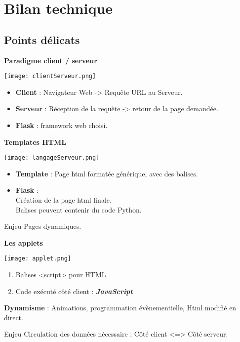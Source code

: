 	\section{Bilan technique}
		\subsection*{Points délicats}
		\begin{frame}
			\textbf{Paradigme client / serveur}\\
				\begin{center}\texttt{[image: clientServeur.png]}\end{center}
				\begin{itemize}
				\item \textbf{Client} : Navigateur Web -> Requête URL au Serveur.
				\item \textbf{Serveur} : Réception de la requête -> retour de la page demandée.
				\item \textbf{Flask} : framework web choisi.
				\end{itemize}
		\end{frame}
		
		\begin{frame}
			\textbf{Templates HTML}\\
				\begin{center}\texttt{[image: langageServeur.png]}\end{center}
				\begin{itemize}
				\item \textbf{Template} : Page html formatée générique, avec des balises.
				\item \textbf{Flask} :\\
					Création de la page html finale.\\
					Balises peuvent contenir du code Python.
				\end{itemize}
				\begin{block}{Enjeu}
				Pages dynamiques.
				\end{block}
		\end{frame}
		
		\begin{frame}
			\textbf{Les applets}\\
				\begin{center}\texttt{[image: applet.png]}\end{center}
				\begin{enumerate}
				\item Balises <script> pour HTML.
				\item Code exécuté côté client : \textbf{\textit{JavaScript}}
				\end{enumerate}
				
				\textbf{Dynamisme} : Animations, programmation évènementielle, Html modifié en direct.
				
				\begin{block}{Enjeu}
				Circulation des données nécessaire : Côté client <=> Côté serveur.
				\end{block}
		\end{frame}
		

